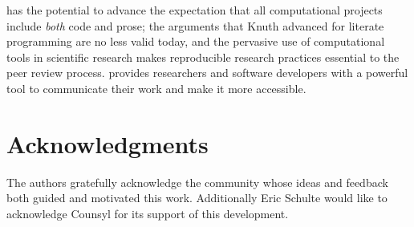 \documentclass[article,shortnames]{jss}
\begin{document}
 has the potential to advance the expectation that all
computational projects include \emph{both} code and prose; the arguments
that Knuth advanced for literate programming are no less valid today,
and the pervasive use of computational tools in scientific research
makes reproducible research practices essential to the peer review
process.   provides researchers and software developers with a
powerful tool to communicate their work and make it more accessible.
\section{Acknowledgments}
\label{sec-6}
\label{acknowledgments}

The authors gratefully acknowledge the  community whose ideas
and feedback both guided and motivated this work.  Additionally Eric
Schulte would like to acknowledge Counsyl for its support of this
development.

  
\end{document}
